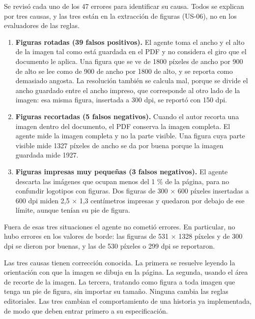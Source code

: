 Se revisó cada uno de los 47 errores para identificar su causa. Todos se explican por tres causas, y las tres están en la extracción de figuras (US-06), no en los evaluadores de las reglas.

\begin{enumerate}
  \item \textbf{Figuras rotadas (39 falsos positivos).} El agente toma el ancho y el alto de la imagen tal como está guardada en el PDF y no considera el giro que el documento le aplica. Una figura que se ve de 1800 píxeles de ancho por 900 de alto se lee como de 900 de ancho por 1800 de alto, y se reporta como demasiado angosta. La resolución también se calcula mal, porque se divide el ancho guardado entre el ancho impreso, que corresponde al otro lado de la imagen: esa misma figura, insertada a 300 dpi, se reportó con 150 dpi.
  \item \textbf{Figuras recortadas (5 falsos negativos).} Cuando el autor recorta una imagen dentro del documento, el PDF conserva la imagen completa. El agente mide la imagen completa y no la parte visible. Una figura cuya parte visible mide 1327 píxeles de ancho se da por buena porque la imagen guardada mide 1927.
  \item \textbf{Figuras impresas muy pequeñas (3 falsos negativos).} El agente descarta las imágenes que ocupan menos del 1 \% de la página, para no confundir logotipos con figuras. Dos figuras de 300 $\times$ 600 píxeles insertadas a 600 dpi miden 2,5 $\times$ 1,3 centímetros impresas y quedaron por debajo de ese límite, aunque tenían su pie de figura.
\end{enumerate}

Fuera de esas tres situaciones el agente no cometió errores. En particular, no hubo errores en los valores de borde: las figuras de 531 $\times$ 1328 píxeles y de 300 dpi se dieron por buenas, y las de 530 píxeles o 299 dpi se reportaron.

Las tres causas tienen corrección conocida. La primera se resuelve leyendo la orientación con que la imagen se dibuja en la página. La segunda, usando el área de recorte de la imagen. La tercera, tratando como figura a toda imagen que tenga un pie de figura, sin importar su tamaño. Ninguna cambia las reglas editoriales. Las tres cambian el comportamiento de una historia ya implementada, de modo que deben entrar primero a su especificación.


